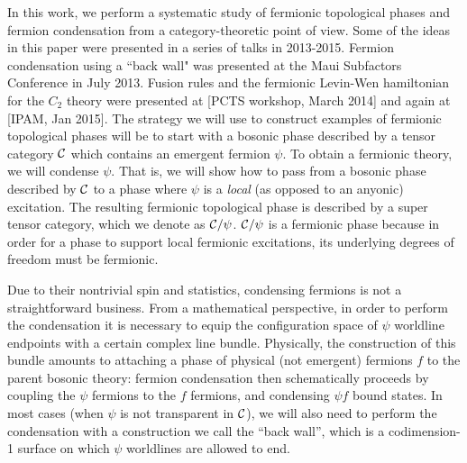In this work, we perform a systematic study of fermionic topological phases and fermion condensation from a category-theoretic
point of view.
Some of the ideas in this paper were presented in a series of talks in 2013-2015.
Fermion condensation using a ``back wall" was presented at the Maui Subfactors Conference in July 2013.
Fusion rules and the fermionic Levin-Wen hamiltonian for the $C_2$ theory were presented at [PCTS workshop, March 2014] and again
at [IPAM, Jan 2015].
The strategy we will use to construct examples of fermionic topological phases will be to start with 
a bosonic phase described by a tensor category $\mathcal{C}$
which contains an emergent fermion $\psi$.
To obtain a fermionic theory, we will condense $\psi$.
That is, we will show how to pass from a bosonic phase 
described by $\mathcal{C}$ to a phase where $\psi$ is a {\it local} (as opposed to an anyonic) excitation.
The resulting fermionic topological phase is described by a super tensor category, which we denote
as $\mathcal{C} / \psi$.
$\mathcal{C}/\psi$ is a fermionic phase because in order for a phase to support local fermionic excitations, 
its underlying degrees of freedom must be fermionic. 

Due to their nontrivial spin and statistics, condensing fermions is not a straightforward business. 
From a mathematical perspective, in order to perform the condensation it is necessary to equip the configuration 
space of $\psi$ worldline endpoints with a certain complex line bundle. 
Physically, the construction of this bundle amounts to attaching a phase of physical (not emergent) fermions $f$ 
to the parent bosonic theory: 
fermion condensation then schematically proceeds by coupling the $\psi$ fermions to 
the $f$ fermions, and condensing $\psi f$ bound states. 
In most cases (when $\psi$ is not transparent in $\mathcal{C}$), we will also need to perform 
the condensation with a construction we call the ``back wall'', which is a codimension-1 surface 
on which $\psi$ worldlines are allowed to end. 

